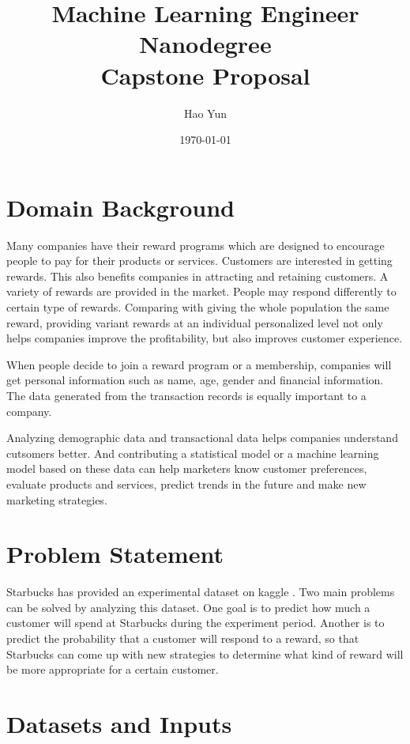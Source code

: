 \documentclass[a4paper,12pt]{article}
\title{Machine Learning Engineer Nanodegree \\ Capstone Proposal}
\author{Hao Yun}
\date{\today}
\begin{document}
\maketitle

\section{Domain Background}

Many companies have their reward programs which are designed to encourage people to pay for their products or services. 
Customers are interested in getting rewards. This also benefits companies in attracting and retaining customers. A variety 
of rewards are provided in the market. People may respond differently to certain type of rewards. Comparing with giving the 
whole population the same reward, providing variant rewards at an individual personalized level not only helps companies 
improve the profitability, but also improves customer experience.

When people decide to join a reward program or a membership, companies will get personal information such as name, age, 
gender and financial information. The data generated from the transaction records is equally important to a company.

Analyzing demographic data and transactional data helps companies understand cutsomers better. And contributing a statistical 
model or a machine learning model based on these data can help marketers know customer preferences, evaluate products and 
services, predict trends in the future and make new marketing strategies.

\section{Problem Statement}

Starbucks has provided an experimental dataset on kaggle \cite{kaggle}. Two main problems can be solved by analyzing this 
dataset. One goal is to predict how much a customer will spend at Starbucks during the experiment period. Another is to 
predict the probability that a customer will respond to a reward, so that Starbucks can come up with new strategies to 
determine what kind of reward will be more appropriate for a certain customer.

\section{Datasets and Inputs}
\end{document}
